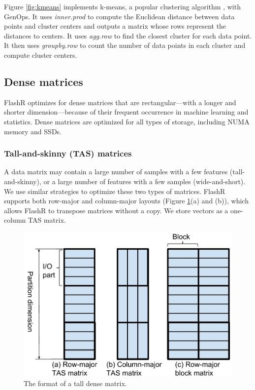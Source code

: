 Figure \ref{fig:kmeans} implements k-means, a popular clustering algorithm
\cite{kmeans}, with GenOps. It uses \textit{inner.prod} to
compute the Euclidean distance between data points and cluster centers
and outputs a matrix whose rows represent the distances to centers.  
It uses \textit{agg.row} to find the closest cluster for each data point.
It then uses \textit{groupby.row} to count
the number of data points in each cluster and compute cluster centers.

\subsection{Dense matrices}
FlashR optimizes for dense matrices that are rectangular---with
a longer and shorter dimension---because of their frequent occurrence
in machine learning and statistics. Dense matrices are optimized for
all types of storage, including NUMA memory and SSDs.

\subsubsection{Tall-and-skinny (TAS) matrices}
A data matrix may contain a large number of samples with a few features
(tall-and-skinny),
or a large number of features with a few samples (wide-and-short).
We use similar strategies to optimize these two types of matrices. FlashR
supports both row-major and column-major layouts (Figure \ref{fig:den_mat}(a)
and (b)), which allows FlashR to transpose matrices without a copy.
We store vectors as a one-column TAS matrix.

\begin{figure}
	\centering
	\includegraphics[scale=0.5]{FlashMatrix_figs/dense_matrix2.pdf}
	\vspace{-5pt}
	\caption{The format of a tall dense matrix.}
	\label{fig:den_mat}
  \vspace{-12pt}
\end{figure}

